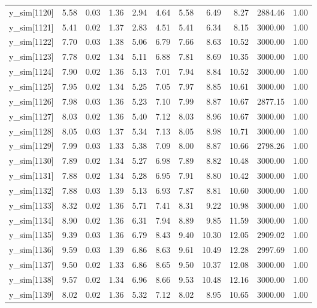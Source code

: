 \begin{table}[ht]
\begin{tabular}{rrrrrrrrrrr}
  y\_sim[1120] & 5.58 & 0.03 & 1.36 & 2.94 & 4.64 & 5.58 & 6.49 & 8.27 & 2884.46 & 1.00 \\ 
  y\_sim[1121] & 5.41 & 0.02 & 1.37 & 2.83 & 4.51 & 5.41 & 6.34 & 8.15 & 3000.00 & 1.00 \\ 
  y\_sim[1122] & 7.70 & 0.03 & 1.38 & 5.06 & 6.79 & 7.66 & 8.63 & 10.52 & 3000.00 & 1.00 \\ 
  y\_sim[1123] & 7.78 & 0.02 & 1.34 & 5.11 & 6.88 & 7.81 & 8.69 & 10.35 & 3000.00 & 1.00 \\ 
  y\_sim[1124] & 7.90 & 0.02 & 1.36 & 5.13 & 7.01 & 7.94 & 8.84 & 10.52 & 3000.00 & 1.00 \\ 
  y\_sim[1125] & 7.95 & 0.02 & 1.34 & 5.25 & 7.05 & 7.97 & 8.85 & 10.61 & 3000.00 & 1.00 \\ 
  y\_sim[1126] & 7.98 & 0.03 & 1.36 & 5.23 & 7.10 & 7.99 & 8.87 & 10.67 & 2877.15 & 1.00 \\ 
  y\_sim[1127] & 8.03 & 0.02 & 1.36 & 5.40 & 7.12 & 8.03 & 8.96 & 10.67 & 3000.00 & 1.00 \\ 
  y\_sim[1128] & 8.05 & 0.03 & 1.37 & 5.34 & 7.13 & 8.05 & 8.98 & 10.71 & 3000.00 & 1.00 \\ 
  y\_sim[1129] & 7.99 & 0.03 & 1.33 & 5.38 & 7.09 & 8.00 & 8.87 & 10.66 & 2798.26 & 1.00 \\ 
  y\_sim[1130] & 7.89 & 0.02 & 1.34 & 5.27 & 6.98 & 7.89 & 8.82 & 10.48 & 3000.00 & 1.00 \\ 
  y\_sim[1131] & 7.88 & 0.02 & 1.34 & 5.28 & 6.95 & 7.91 & 8.80 & 10.42 & 3000.00 & 1.00 \\ 
  y\_sim[1132] & 7.88 & 0.03 & 1.39 & 5.13 & 6.93 & 7.87 & 8.81 & 10.60 & 3000.00 & 1.00 \\ 
  y\_sim[1133] & 8.32 & 0.02 & 1.36 & 5.71 & 7.41 & 8.31 & 9.22 & 10.98 & 3000.00 & 1.00 \\ 
  y\_sim[1134] & 8.90 & 0.02 & 1.36 & 6.31 & 7.94 & 8.89 & 9.85 & 11.59 & 3000.00 & 1.00 \\ 
  y\_sim[1135] & 9.39 & 0.03 & 1.36 & 6.79 & 8.43 & 9.40 & 10.30 & 12.05 & 2909.02 & 1.00 \\ 
  y\_sim[1136] & 9.59 & 0.03 & 1.39 & 6.86 & 8.63 & 9.61 & 10.49 & 12.28 & 2997.69 & 1.00 \\ 
  y\_sim[1137] & 9.50 & 0.02 & 1.33 & 6.86 & 8.65 & 9.50 & 10.37 & 12.08 & 3000.00 & 1.00 \\ 
  y\_sim[1138] & 9.57 & 0.02 & 1.34 & 6.96 & 8.66 & 9.53 & 10.48 & 12.16 & 3000.00 & 1.00 \\ 
  y\_sim[1139] & 8.02 & 0.02 & 1.36 & 5.32 & 7.12 & 8.02 & 8.95 & 10.65 & 3000.00 & 1.00 \\ 

\end{tabular}
\end{table}
